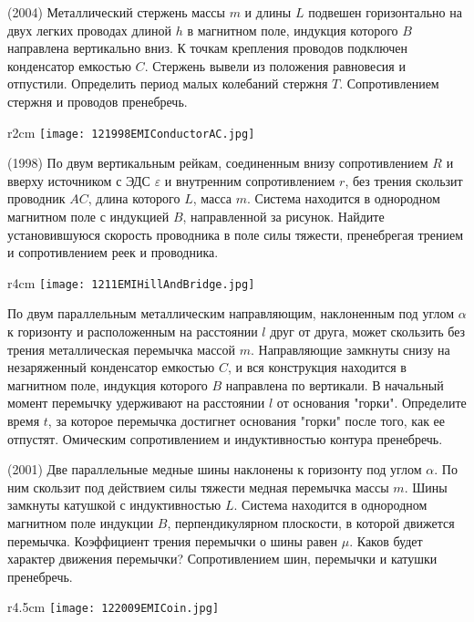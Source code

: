 \AddProb (2004) Металлический стержень массы $m$ и длины $L$ подвешен горизонтально на двух легких проводах длиной $h$ в магнитном поле, 
индукция которого $B$ направлена вертикально вниз. К точкам крепления проводов подключен конденсатор емкостью $C$. 
Стержень вывели из положения равновесия и отпустили. Определить период малых колебаний стержня $T$. Сопротивлением стержня и проводов пренебречь.

\begin{wrapfigure}{r}{2cm}
\texttt{[image: 121998EMIConductorAC.jpg]}
\end{wrapfigure}

\AddProb (1998) По двум вертикальным рейкам, соединенным внизу сопротивлением $R$ и вверху источником с ЭДС {\Large $\varepsilon$} 
и внутренним сопротивлением $r$, без трения скользит проводник $AC$, длина которого $L$, масса $m$. 
Система находится в однородном магнитном поле с индукцией $B$, направленной за рисунок. 
Найдите установившуюся скорость проводника в поле силы тяжести, пренебрегая трением и сопротивлением реек и проводника.

\begin{wrapfigure}{r}{4cm}
\texttt{[image: 1211EMIHillAndBridge.jpg]}
\end{wrapfigure}

\AddProb По двум параллельным металлическим направляющим, наклоненным под углом $\alpha$ к горизонту и 
расположенным на расстоянии $l$ друг от друга, может скользить без трения металлическая перемычка массой $m$. 
Направляющие замкнуты снизу на незаряженный конденсатор емкостью $C$, и вся конструкция находится в магнитном поле, 
индукция которого $B$ направлена по вертикали. В начальный момент перемычку удерживают на расстоянии $l$ от основания "горки". 
Определите время $t$, за которое перемычка достигнет основания "горки" после того, как ее отпустят. 
Омическим сопротивлением и индуктивностью контура пренебречь.

\AddProb (2001) Две параллельные медные шины наклонены к горизонту под углом  $\alpha$. 
По ним скользит под действием силы тяжести медная перемычка массы $m$. Шины замкнуты катушкой с индуктивностью $L$. 
Система находится в однородном магнитном поле индукции $B$, перпендикулярном плоскости, в которой движется перемычка. 
Коэффициент трения перемычки о шины равен $\mu$. Каков будет характер движения перемычки? Сопротивлением шин, перемычки и катушки пренебречь.

\begin{wrapfigure}{r}{4.5cm}
\texttt{[image: 122009EMICoin.jpg]}
\end{wrapfigure}

